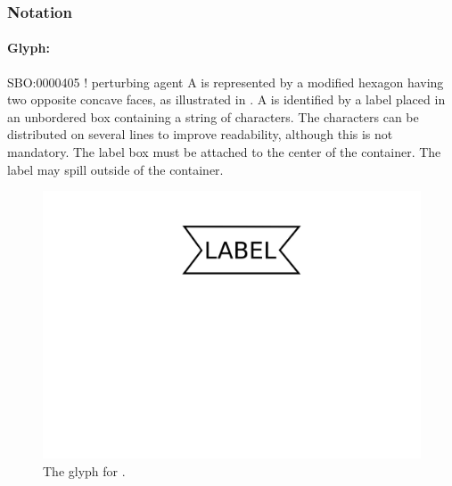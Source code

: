 \begin{valrules}
\end{valrules}


\subsubsection{Notation}

\paragraph{Glyph: }

\begin{glyphDescription}
\glyphSboTerm SBO:0000405 ! perturbing agent
\glyphContainer A  is represented by a modified hexagon
having two opposite concave faces, as illustrated in .
\glyphLabel A  is identified by a label placed in an
unbordered box containing a string of characters.  The characters can be
distributed on several lines to improve readability, although this is not
mandatory.  The label box must be attached to the center of the
 container.  The label may spill outside of the container.
\end{glyphDescription}

\begin{figure}[htb]
  \centering
  \includegraphics[scale = 0.3]{images/perturbing_agent}
  \caption{The \PD glyph for .}
  \label{fig:techref:perturbing agent}
\end{figure}

